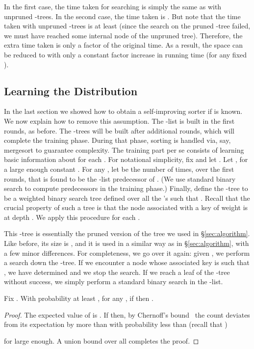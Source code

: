 \documentclass{siamltex}
\begin{document}
In the first case, the time taken for searching is
simply the same as with
unpruned -trees. In the second case, the time
taken is . But note that the time
taken with unpruned -trees is at least 
(since the search on the pruned -tree failed, we
must have reached some internal node of the unpruned tree).
Therefore, the extra time taken is only a  factor
of the original time. As a result, the space can be
reduced to  with only a constant factor
increase in running time (for any fixed ).

\subsection{Learning the Distribution}\label{sec:SI-sort}

In the last section we showed how to obtain a self-improving
sorter if  is known. We now explain how to remove this assumption.
The -list is built in the first  rounds, as
before.
The -trees will be built after  additional rounds,
which will complete the training phase. During that phase,
sorting is handled via, say, mergesort to guarantee  complexity.
The training part per se consists of learning basic information
about  for each . For notational simplicity, fix 
and let .
Let , for a large enough constant .
For any , let  be the number of times, 
over the first  rounds, that  is
found to be the -list predecessor of . (We use
standard binary search to compute predecessors in the training phase.)
Finally, define the -tree to be a
weighted binary search tree defined over all the 's such that
. Recall that the crucial property of such
a tree is that the node associated with a key of weight 
is at depth . 
We apply this procedure for each .

This -tree is essentially the pruned version
of the tree we used in \S \ref{sec:algorithm}. Like before, its size is
, and it is used in a similar
way as in \S \ref{sec:algorithm}, with a few minor differences. For 
completeness, we go over it again: given , we perform a search down the -tree. If we encounter a node
whose associated key  is such that ,
we have determined   and we stop the search.
If we reach a leaf of the -tree without success, we
simply perform a standard binary search in the -list.
\medskip
\begin{lemma} \label{lem:learn} 
Fix . With probability at least , for any ,
if  then .
\end{lemma}

\begin{proof}
The expected value of  is . If 
then, by Chernoff's bound~\cite[Corollary~A.17]{AlonS} 
the count  deviates from its expectation by more than 
 with probability less than (recall that )

for  large enough.
A union bound over all  completes the proof.
\end{proof}
\medskip
\end{document}
